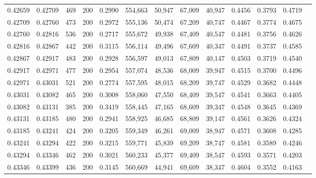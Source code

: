 \begin{tabular}{rrrrrrrrrrrrr}
0.42659 & 0.42709 &    469 & 200 &                                     0.2990 & 554,663 &  50,947 &  67,009 &  40,947 & 0.4456 & 0.3793 & 0.4719 \\
0.42709 & 0.42760 &    473 & 200 &                                     0.2972 & 555,136 &  50,474 &  67,209 &  40,747 & 0.4467 & 0.3774 & 0.4675 \\
0.42760 & 0.42816 &    536 & 200 &                                     0.2717 & 555,672 &  49,938 &  67,409 &  40,547 & 0.4481 & 0.3756 & 0.4626 \\
0.42816 & 0.42867 &    442 & 200 &                                     0.3115 & 556,114 &  49,496 &  67,609 &  40,347 & 0.4491 & 0.3737 & 0.4585 \\
0.42867 & 0.42917 &    483 & 200 &                                     0.2928 & 556,597 &  49,013 &  67,809 &  40,147 & 0.4503 & 0.3719 & 0.4540 \\
0.42917 & 0.42971 &    477 & 200 &                                     0.2954 & 557,074 &  48,536 &  68,009 &  39,947 & 0.4515 & 0.3700 & 0.4496 \\
0.42971 & 0.43031 &    521 & 200 &                                     0.2774 & 557,595 &  48,015 &  68,209 &  39,747 & 0.4529 & 0.3682 & 0.4448 \\
0.43031 & 0.43082 &    465 & 200 &                                     0.3008 & 558,060 &  47,550 &  68,409 &  39,547 & 0.4541 & 0.3663 & 0.4405 \\
0.43082 & 0.43131 &    385 & 200 &                                     0.3419 & 558,445 &  47,165 &  68,609 &  39,347 & 0.4548 & 0.3645 & 0.4369 \\
0.43131 & 0.43185 &    480 & 200 &                                     0.2941 & 558,925 &  46,685 &  68,809 &  39,147 & 0.4561 & 0.3626 & 0.4324 \\
0.43185 & 0.43241 &    424 & 200 &                                     0.3205 & 559,349 &  46,261 &  69,009 &  38,947 & 0.4571 & 0.3608 & 0.4285 \\
0.43241 & 0.43294 &    422 & 200 &                                     0.3215 & 559,771 &  45,839 &  69,209 &  38,747 & 0.4581 & 0.3589 & 0.4246 \\
0.43294 & 0.43346 &    462 & 200 &                                     0.3021 & 560,233 &  45,377 &  69,409 &  38,547 & 0.4593 & 0.3571 & 0.4203 \\
0.43346 & 0.43399 &    436 & 200 &                                     0.3145 & 560,669 &  44,941 &  69,609 &  38,347 & 0.4604 & 0.3552 & 0.4163 \\

\end{tabular}
